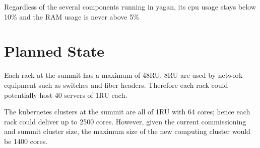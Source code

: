 Regardless of the several components running in yagan, its cpu usage stays below 10\% and the RAM usage is never above 5\%


\section{Planned State}

Each rack at the summit has a maximum of 48RU, 8RU are used by network equipment such as switches and fiber headers. Therefore each rack could potentially host 40 servers of 1RU each.

The kubernetes clusters at the summit are all of 1RU with 64 cores; hence each rack could deliver up to 2500 cores. However, given the current commissioning and summit cluster size, the maximum size of the new computing cluster would be 1400 cores. 
